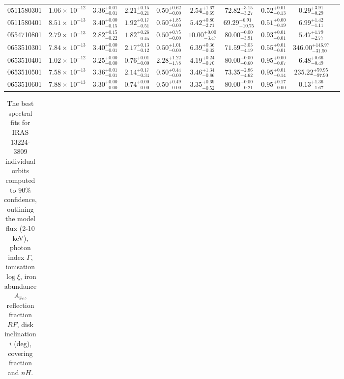 \documentclass{article}
\begin{document}
\begin{landscape}
\begin{longtable}{cccccccccl}
0511580301 & $1.06 \times~10^{-12}$ & $3.36^{+0.01}_{-0.01}$ & $2.21^{+0.15}_{-0.21}$ & $0.50^{+0.62}_{-0.00}$ & $2.54^{+1.67}_{-0.69}$ & $72.82^{+3.15}_{-3.27}$ &  $0.52^{+0.01}_{-0.13}$ & $0.29^{+3.91}_{-0.29}$\\
0511580401 & $8.51 \times~10^{-13}$ & $3.40^{+0.00}_{-0.15}$ & $1.92^{+0.17}_{-0.51}$ & $0.50^{+1.85}_{-0.00}$ & $5.42^{+0.80}_{-2.71}$ & $69.29^{+6.91}_{-10.75}$ &  $0.51^{+0.00}_{-0.19}$ & $6.99^{+1.42}_{-1.11}$ \\
0554710801 & $2.79 \times~10^{-13}$ & $2.82^{+0.15}_{-0.22}$ & $1.82^{+0.26}_{-0.45}$ & $0.50^{+0.75}_{-0.00}$ & $10.00^{+0.00}_{-3.47}$ & $80.00^{+0.00}_{-3.91}$ &  $0.93^{+0.01}_{-0.01}$ & $5.47^{+1.79}_{-2.77}$\\
0653510301 & $7.84 \times~10^{-13}$ & $3.40^{+0.00}_{-0.01}$ & $2.17^{+0.13}_{-0.12}$ & $0.50^{+1.01}_{-0.00}$ & $6.39^{+0.36}_{-0.32}$ & $71.59^{+3.03}_{-4.19}$ &  $0.55^{+0.01}_{-0.01}$ & $346.00^{+146.97}_{-31.50}$\\
0653510401 & $1.02 \times~10^{-12}$ & $3.25^{+0.00}_{-0.00}$ & $0.76^{+0.01}_{-0.00}$ & $2.28^{+1.22}_{-1.78}$ & $4.19^{+0.24}_{-0.70}$ & $80.00^{+0.00}_{-0.60}$ &  $0.95^{+0.00}_{-0.07}$ & $6.48^{+0.66}_{-0.49}$\\
0653510501 & $7.58 \times~10^{-13}$ & $3.36^{+0.01}_{-0.01}$ & $2.14^{+0.17}_{-0.34}$ & $0.50^{+0.44}_{-0.00}$ & $3.46^{+1.34}_{-0.86}$ & $73.35^{+2.86}_{-4.62}$ &  $0.95^{+0.01}_{-0.14}$ & $235.22^{+59.95}_{-97.90}$\\
0653510601 & $7.88 \times~10^{-13}$ & $3.30^{+0.00}_{-0.00}$ & $0.74^{+0.00}_{-0.00}$ & $0.50^{+0.49}_{-0.00}$ & $3.35^{+0.69}_{-0.52}$ & $80.00^{+0.00}_{-0.21}$ &  $0.95^{+0.17}_{-0.00}$ & $0.13^{+1.36}_{-1.67}$\\
\end{longtable}



\clearpage

\begin{longtable}{cccccccccl}
\caption[IRAS 13224-3809 individual orbits Relxill spectral fits]{The best spectral fits for IRAS 13224-3809 individual orbits computed to 90\% confidence, outlining the model flux (2-10 keV), photon index $\Gamma$, ionisation $\log\xi$, iron abundance $A_\text{Fe}$, reflection fraction $RF$, disk inclination $i$ (deg), covering fraction and $nH$.}\\


\end{longtable}
\end{landscape}
\end{document}
